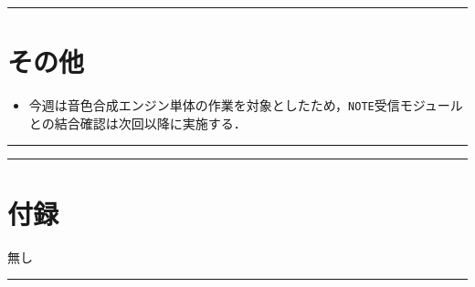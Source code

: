 \documentclass[uplatex,dvipdfmx,a4paper,11pt]{jsarticle}
\newcommand{\sectionrule}{\par\medskip\noindent\rule{\linewidth}{0.6pt}\par\medskip}
\begin{document}
\sectionrule

\section{その他}

\begin{itemize}
  \item 今週は音色合成エンジン単体の作業を対象としたため，\texttt{NOTE}受信モジュールとの結合確認は次回以降に実施する．
\end{itemize}

\sectionrule

\sectionrule

\section{付録}
無し
\sectionrule
\end{document}
